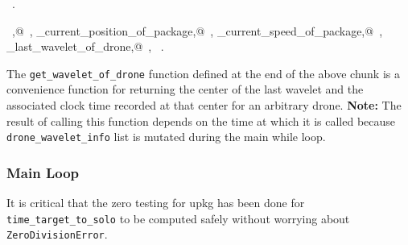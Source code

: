\documentclass[10pt, english, oneside]{report}
\begin{document}
\begin{flushleft}
\begin{minipage}{\linewidth}
\begin{list}{}{\setlength{\itemsep}{-\parsep}\setlength{\itemindent}{-\leftmargin}}
\item \NWtxtMacroRefIn\ .
\item \NWtxtIdentsDefed\nobreak\  \verb@dronelabel,@\nobreak\ \NWtxtIdentsNotUsed, \verb@get_current_position_of_package,@\nobreak\ \NWtxtIdentsNotUsed, \verb@get_current_speed_of_package,@\nobreak\ \NWtxtIdentsNotUsed, \verb@get_last_wavelet_of_drone,@\nobreak\ \NWtxtIdentsNotUsed, \verb@packagelabel@\nobreak\ .
\item{}
\end{list}
\end{minipage}\vspace{4ex}
\end{flushleft}

 The \verb|get_wavelet_of_drone| function defined at the end of the above chunk is a convenience function 
 for returning the center of the last wavelet and the associated clock time recorded at that center
 for an arbitrary drone.  \textbf{Note:} The result of calling this function depends on the time at which it 
 is called because \verb|drone_wavelet_info| list is mutated during the main while loop.

\subsubsection{Main Loop}
\label{ssec:mainloopmatchmove}




It is critical that the zero testing for upkg has 
been done for \verb|time_target_to_solo| to be computed safely 
without worrying about \verb|ZeroDivisionError|.
\end{document}

